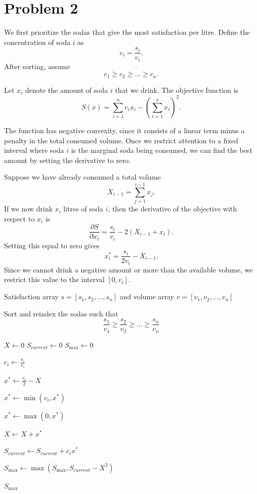 \documentclass[11pt]{article}
\begin{document}
\section{Problem 2}

We first prioritize the sodas that give the most satisfaction per litre. Define the concentration of soda $i$ as
\[
c_i = \frac{s_i}{v_i}.
\]
After sorting, assume
\[
c_1 \ge c_2 \ge \dots \ge c_n.
\]

Let $x_i$ denote the amount of soda $i$ that we drink. The objective function is
\[
S(x) = \sum_{i=1}^n c_i x_i - \left(\sum_{i=1}^n x_i\right)^2.
\]

The function has negative convexity, since it consists of a linear term minus a penalty in the total consumed volume. Once we restrict attention to a fixed interval where soda $i$ is the marginal soda 
being consumed, we can find the best amount by setting the derivative to zero.

Suppose we have already consumed a total volume
\[
X_{i-1} = \sum_{j=1}^{i-1} x_j.
\]
If we now drink $x_i$ litres of soda $i$, then the derivative of the objective with respect to $x_i$ is
\[
\frac{\partial S}{\partial x_i}
=
\frac{s_i}{v_i} - 2(X_{i-1}+x_i).
\]
Setting this equal to zero gives
\[
x_i^*
=
\frac{s_i}{2v_i} - X_{i-1}.
\]
Since we cannot drink a negative amount or more than the available volume, we restrict this value to the interval $[0,v_i]$.

\begin{algorithm}
\caption{Greedy algorithm to maximize satisfaction}
\begin{algorithmic}[1]

\Require Satisfaction array $s = [s_1, s_2, \dots, s_n]$ and volume array $v = [v_1, v_2, \dots, v_n]$

\State Sort and reindex the sodas such that
\[
\frac{s_1}{v_1} \ge \frac{s_2}{v_2} \ge \dots \ge \frac{s_n}{v_n}
\]

\State $X \gets 0$ 
\State $S_{current} \gets 0$ 
\State $S_{\max} \gets 0$

    \State $c_i \gets \frac{s_i}{v_i}$

    \State $x^* \gets \frac{c_i}{2} - X$ 

    \State $x^* \gets \min(v_i, x^*)$ 

    \State $x^* \gets \max(0, x^*)$ 

    \State $X \gets X + x^*$

    \State $S_{current} \gets S_{current} + c_i x^*$

    \State $S_{\max} \gets \max(S_{\max}, S_{current} - X^2)$

\EndFor

\State \Return $S_{\max}$

\end{algorithmic}
\end{algorithm}
\end{document}
